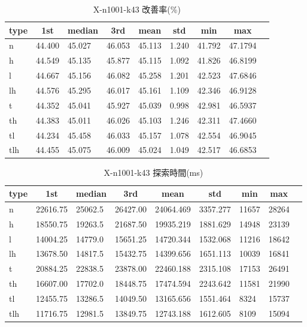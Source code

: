 \begin{table}[htbp]
    \caption{X-n1001-k43 改善率(\%)}
    \begin{tabular}{|l|l|l|l|l|l|l|l|l|}\hline
    \multicolumn{1}{|c|}{\textbf{type}}
    &\multicolumn{1}{|c|}{\textbf{1st}}
    &\multicolumn{1}{c|}{\textbf{median}}
    &\multicolumn{1}{c|}{\textbf{3rd}}
    &\multicolumn{1}{c|}{\textbf{mean}}
    &\multicolumn{1}{c|}{\textbf{std}}
    &\multicolumn{1}{c|}{\textbf{min}}
    &\multicolumn{1}{c|}{\textbf{max}}\\\hline
	n & 44.400 & 45.027 & 46.053 & 45.113 & 1.240 & 41.792 & 47.1794\\\hline
	h & 44.549 & 45.135 & 45.877 & 45.115 & 1.092 & 41.826 & 46.8199\\\hline
	l & 44.667 & 45.156 & 46.082 & 45.258 & 1.201 & 42.523 & 47.6846\\\hline
	lh & 44.576 & 45.295 & 46.017 & 45.161 & 1.109 & 42.346 & 46.9128\\\hline
	t & 44.352 & 45.041 & 45.927 & 45.039 & 0.998 & 42.981 & 46.5937\\\hline
	th & 44.383 & 45.011 & 46.026 & 45.103 & 1.246 & 42.311 & 47.4660\\\hline
	tl & 44.234 & 45.458 & 46.033 & 45.157 & 1.078 & 42.554 & 46.9045\\\hline
	tlh & 44.455 & 45.075 & 46.009 & 45.024 & 1.049 & 42.517 & 46.6853\\\hline
	\end{tabular}
\end{table}
\begin{table}[htbp]
    \caption{X-n1001-k43 探索時間(ms)}
    \begin{tabular}{|l|l|l|l|l|l|l|l|l|}\hline
    \multicolumn{1}{|c|}{\textbf{type}}
    &\multicolumn{1}{|c|}{\textbf{1st}}
    &\multicolumn{1}{c|}{\textbf{median}}
    &\multicolumn{1}{c|}{\textbf{3rd}}
    &\multicolumn{1}{c|}{\textbf{mean}}
    &\multicolumn{1}{c|}{\textbf{std}}
    &\multicolumn{1}{c|}{\textbf{min}}
    &\multicolumn{1}{c|}{\textbf{max}}\\\hline
	n & 22616.75 & 25062.5 & 26427.00 & 24064.469 & 3357.277 & 11657 & 28264\\\hline
	h & 18550.75 & 19263.5 & 21687.50 & 19935.219 & 1881.629 & 14948 & 23139\\\hline
	l & 14004.25 & 14779.0 & 15651.25 & 14720.344 & 1532.068 & 11216 & 18642\\\hline
	lh & 13678.50 & 14817.5 & 15432.75 & 14399.656 & 1651.113 & 10039 & 16841\\\hline
	t & 20884.25 & 22838.5 & 23878.00 & 22460.188 & 2315.108 & 17153 & 26491\\\hline
	th & 16607.00 & 17702.0 & 18448.75 & 17474.594 & 2243.642 & 11581 & 21990\\\hline
	tl & 12455.75 & 13286.5 & 14049.50 & 13165.656 & 1551.464 & 8324 & 15737\\\hline
	tlh & 11716.75 & 12981.5 & 13849.75 & 12743.188 & 1612.605 & 8109 & 15094\\\hline
	\end{tabular}
\end{table}
